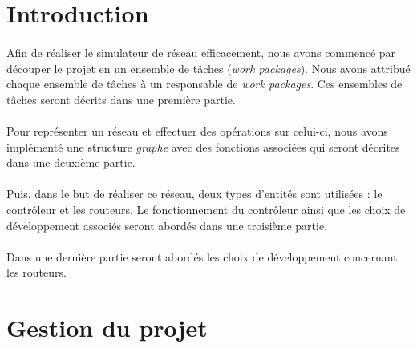 \section{Introduction}
\paragraph{}Afin de réaliser le simulateur de réseau efficacement, nous avons commencé par
découper le projet en un ensemble de tâches (\textit{work packages}). Nous avons
attribué chaque ensemble de tâches à un responsable de \textit{work packages}.
Ces ensembles de tâches seront décrits dans une première partie.
\paragraph{}Pour représenter un réseau et effectuer des opérations sur celui-ci,
nous avons implémenté une structure \textit{graphe} avec des fonctions associées qui
seront décrites dans une deuxième partie.
\paragraph{}Puis, dans le but de réaliser ce réseau, deux types d'entités sont utilisées : le contrôleur et les routeurs. Le fonctionnement du contrôleur ainsi que
les choix de développement associés seront abordés dans une troisième partie.
\paragraph{}Dans une dernière partie seront abordés les choix de développement
concernant les routeurs.
\section{Gestion du projet}
